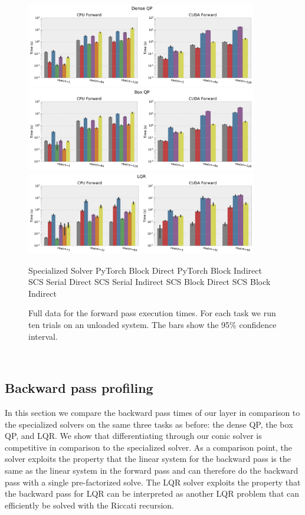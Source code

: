 \begin{figure}[!h]
  \centering
  \includegraphics[width=0.9\textwidth]{prof/prof_qp_dense-forward.pdf}
  \includegraphics[width=0.9\textwidth]{prof/prof_qp_box-forward.pdf}
  \includegraphics[width=0.9\textwidth]{prof/prof_mpc-forward.pdf}

   Specialized Solver \enskip
   PyTorch Block Direct \enskip
   PyTorch Block Indirect \\
   SCS Serial Direct \enskip
   SCS Serial Indirect \enskip
   SCS Block Direct \enskip
   SCS Block Indirect

  \caption{Full data for the forward pass execution times.
    For each task we run ten trials on an unloaded system.
    The bars show the 95\% confidence interval.
  }
  \label{fig:eval:fwd:all}
\end{figure}

\newpage~\newpage~\newpage
\subsection{Backward pass profiling}
\label{sec:cvxpyth:bw_prof}
In this section we compare the backward pass times of
our layer in comparison to the specialized solvers
on the same three tasks as before: the dense QP,
the box QP, and LQR.
We show that differentiating through our conic
solver is competitive in comparison to the
specialized solver.
As a comparison point, the \qpth solver exploits
the property that the linear system for the backward pass is the
same as the linear system in the forward pass and can therefore
do the backward pass with a single pre-factorized solve.
The LQR solver exploits the property that the backward
pass for LQR can be interpreted as another LQR problem that
can efficiently be solved with the Riccati recursion.

